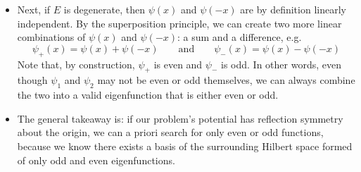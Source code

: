 \documentclass[11pt, a4paper]{article}
\newcommand{\eqtext}[1]{\qquad \text{#1} \qquad}
\begin{document}
\begin{itemize}
	\item Next, if $ E $ is degenerate, then $ \psi(x) $ and $ \psi(-x) $ are by definition linearly independent. By the superposition principle, we can create two more linear combinations of $ \psi(x) $ and $ \psi(-x) $: a sum and a difference, e.g.
	\begin{equation*}
		\psi_{+}(x) = \psi(x) + \psi(-x) \eqtext{and} \psi_{-}(x) = \psi(x) - \psi(-x) 
	\end{equation*}
	Note that, by construction, $ \psi_{+} $ is even and $ \psi_{-} $ is odd. In other words, even though $ \psi_{1} $ and $ \psi_{2} $ may not be even or odd themselves, we can always combine the two into a valid eigenfunction that is either even or odd.
	
	\item The general takeaway is: if our problem's potential has reflection symmetry about the origin, we can a priori search for only even or odd functions, because we know there exists a basis of the surrounding Hilbert space formed of only odd and even eigenfunctions.
\end{itemize}
\end{document}
